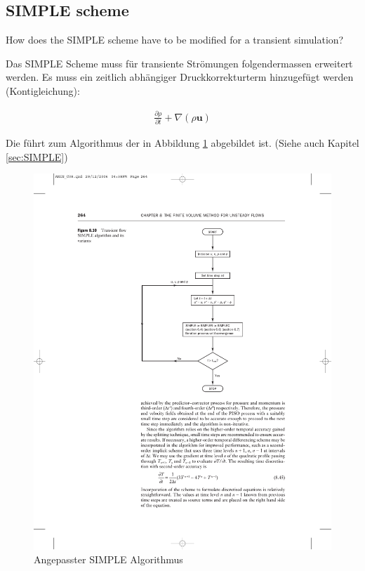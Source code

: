 \documentclass[a4paper]{scrartcl}
\begin{document}
\subsection{SIMPLE scheme}
How does the SIMPLE scheme have to be modified for a transient
simulation?
 
Das SIMPLE Scheme muss für transiente Strömungen folgendermassen erweitert
werden. Es muss ein zeitlich abhängiger Druckkorrekturterm hinzugefügt werden
(Kontigleichung):

\begin{align}
\frac{\partial \rho}{\partial t} + \nabla (\rho \mathbf{u}) 
\end{align}

Die führt zum Algorithmus der in Abbildung \ref{fig:82} abgebildet ist. (Siehe
auch Kapitel \ref{sec:SIMPLE})

\begin{figure}[h!]
\begin{center}
\includegraphics[scale=1.0]{images/82.pdf}
\caption{Angepasster SIMPLE Algorithmus}
\label{fig:82}
\end{center}
\end{figure}
\end{document}
